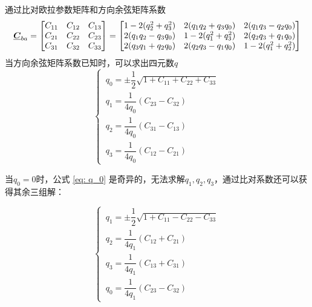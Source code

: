 \sssection[欧拉参数与方向余弦矩阵之间的转换]

通过比对欧拉参数矩阵和方向余弦矩阵系数
\begin{equation}
	\underline{\bm{C}}_{ba} = 
	\begin{bmatrix}
		C_{11} & C_{12} & C_{13} \\
		C_{21} & C_{22} & C_{23} \\
		C_{31} & C_{32} & C_{33}
	\end{bmatrix}
	= 
	\begin{bmatrix}
		1 - 2(q_2^2 + q_3^2) & 2(q_1q_2 + q_3q_0) & 2(q_1q_3 - q_2q_0)\\
		2(q_1q_2 - q_3q_0)  & 1 - 2(q_1^2 + q_3^2) & 2(q_2q_3 + q_1q_0) \\
		2(q_3q_1 + q_2q_0)& 2(q_2q_3 - q_1q_0) & 1 - 2(q_1^2 + q_2^2)
	\end{bmatrix}
\end{equation}
当方向余弦矩阵系数已知时，可以求出四元数$q$
\begin{equation}
	\begin{cases}
		\, q_0 =  \pm \dfrac{1}{2} \sqrt{1 + C_{11} + C_{22} + C_{33}} \\[0.8em]
		\, q_1 = \dfrac{1}{4q_0}(C_{23} - C_{32}) \\[0.8em]
		\, q_2 = \dfrac{1}{4q_0}(C_{31} - C_{13}) \\[0.8em]
		\, q_3 = \dfrac{1}{4q_0}(C_{12} - C_{21})
	\end{cases}
	\label{eq: q_0}
\end{equation}

当$q_0 = 0$时，公式 \eqref{eq: q_0} 是奇异的，无法求解$q_1, q_2, q_3$，通过比对系数还可以获得其余三组解：

\begin{equation}
	\begin{cases}
		\, q_1 = \pm \dfrac{1}{2} \sqrt{1 + C_{11} - C_{22} - C_{33}} \\[0.8em]
		\, q_2 = \dfrac{1}{4q_1}(C_{12} + C_{21}) \\[0.8em]
		\, q_3 = \dfrac{1}{4q_1}(C_{13} + C_{31}) \\[0.8em]
		\, q_0 = \dfrac{1}{4q_1}(C_{23} - C_{32})
	\end{cases}
\end{equation}

